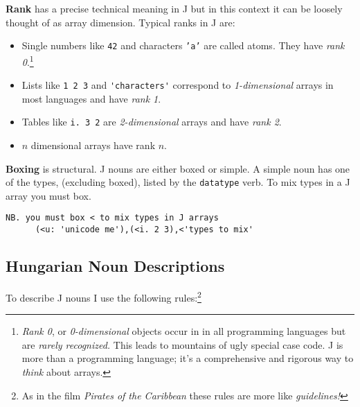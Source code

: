 \textbf{Rank} has a precise technical meaning in J but in this context it can be loosely
thought of as array dimension.   Typical ranks in J are:
\begin{itemize}
	\item Single numbers like \texttt{42} and characters \texttt{'a'} are called atoms. They
	have \textsl{rank 0}.\footnote{\textsl{Rank 0}, or \textsl{0-dimensional} objects occur in
	in all programming languages but are \emph{rarely recognized.} This leads to mountains of ugly special case code. J is more than a programming language; it's a comprehensive and rigorous way 
to \emph{think} about arrays.} 
	\item Lists like \verb|1 2 3| and \verb|'characters'| correspond to \textsl{1-dimensional} arrays
	in most languages and have \textsl{rank 1}.
	\item Tables like \verb|i. 3 2| are \textsl{2-dimensional} arrays and have \textsl{rank 2}.  
	\item $n$ dimensional arrays have rank $n$.
\end{itemize}

\textbf{Boxing} is structural.  J nouns are either boxed or simple.  A  simple noun
has one of the types, (excluding boxed), listed by
the \texttt{datatype} verb.  To mix types in a J array you must box.
\begin{lstlisting}[frame=single,framerule=0pt] 
      NB. you must box < to mix types in J arrays
      (<u: 'unicode me'),(<i. 2 3),<'types to mix'
\end{lstlisting}  

\subsection{Hungarian Noun Descriptions}

To describe J nouns I use the following rules:\footnote{As in
the film \emph{Pirates of the Caribbean} these rules are more like \emph{guidelines!}} 


